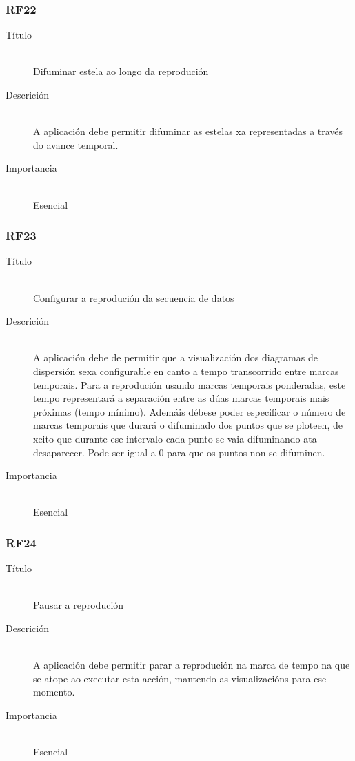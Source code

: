 \subsubsection*{RF22}
\begin{description}
\item[Título] \hfill \\
Difuminar estela ao longo da reprodución
\item[Descrición] \hfill \\
A aplicación debe permitir difuminar as estelas xa representadas a través do avance temporal.
\item[Importancia] \hfill \\
Esencial
\end{description}

\subsubsection*{RF23}
\begin{description}
\item[Título] \hfill \\
Configurar a reprodución da secuencia de datos
\item[Descrición] \hfill \\
A aplicación debe de permitir que a visualización dos diagramas de dispersión sexa configurable en canto a tempo transcorrido entre marcas temporais. Para a reprodución usando marcas temporais ponderadas, este tempo representará a separación entre as dúas marcas temporais mais próximas (tempo mínimo). Ademáis débese poder especificar o número de marcas temporais que durará o difuminado dos puntos que se ploteen, de xeito que durante ese intervalo cada punto se vaia difuminando ata desaparecer. Pode ser igual a 0 para que os puntos non se difuminen.
\item[Importancia] \hfill \\
Esencial
\end{description}

\subsubsection*{RF24}
\begin{description}
\item[Título] \hfill \\
Pausar a reprodución
\item[Descrición] \hfill \\
A aplicación debe permitir parar a reprodución na marca de tempo na que se atope ao executar esta acción, mantendo as visualizacións para ese momento.
\item[Importancia] \hfill \\
Esencial
\end{description}

